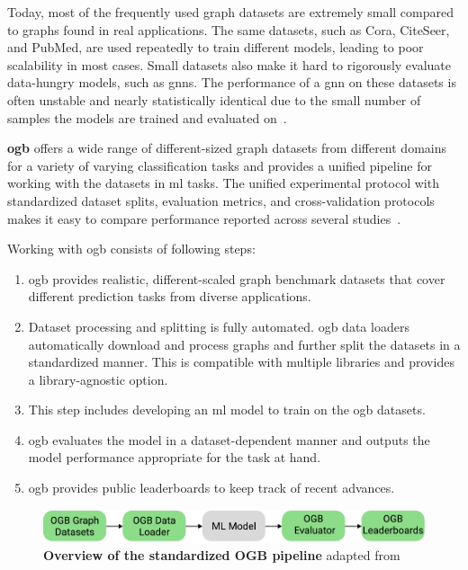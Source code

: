 Today, most of the frequently used graph datasets are extremely small compared to graphs found in real applications.
The same datasets, such as Cora, CiteSeer, and PubMed, are used repeatedly to train different models, leading to poor scalability in most cases. Small datasets also make it hard to rigorously evaluate data-hungry models, such as \acfp{gnn}.
The performance of a \ac{gnn} on these datasets is often unstable and nearly statistically identical due to the small number of samples the models are trained and evaluated on~\cite{Kipf2017,Xu2019, Hu2020}.

\textbf{\Ac{ogb}} offers a wide range of different-sized graph datasets from different domains for a variety of varying classification tasks and provides a unified pipeline for working with the datasets in \ac{ml} tasks.
The unified experimental protocol with standardized dataset splits, evaluation metrics, and cross-validation protocols makes it easy to compare performance reported across several studies~\cite{Hu2020}.

Working with \ac{ogb} consists of following steps:

\begin{enumerate}
    \item \Ac{ogb} provides realistic, different-scaled graph benchmark datasets that cover different prediction tasks from diverse applications.
    \item Dataset processing and splitting is fully automated. \Ac{ogb} data loaders automatically download and process graphs and further split the datasets in a standardized manner.
          This is compatible with multiple libraries and provides a library-agnostic option.
    \item This step includes developing an \ac{ml} model to train on the \ac{ogb} datasets.
    \item  \Ac{ogb} evaluates the model in a dataset-dependent manner and outputs the model performance appropriate for the task at hand.
    \item \Ac{ogb} provides public leaderboards to keep track of recent advances.
\end{enumerate}

\begin{figure}[H]
    \centering
    \includegraphics[width= 0.90\linewidth]{gfx/implementation/OGB_pipeline}
    \caption{\textbf{Overview of the standardized OGB pipeline} adapted from \cite{Hu2020}}\label{fig:implement:pipeline}
\end{figure}

